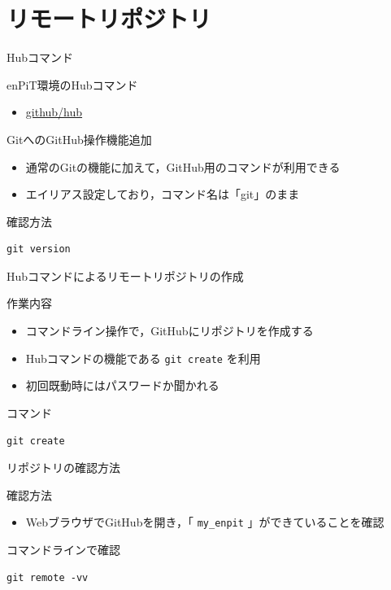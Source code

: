 \documentclass[t, aspectratio=169]{beamer}
\begin{document}
\section{リモートリポジトリ}
\label{sec-2-2}
\begin{frame}[fragile,label=sec-2-2-1]{Hubコマンド}
 \begin{block}{enPiT環境のHubコマンド}
\begin{itemize}
\item \href{https://github.com/github/hub}{github/hub}
\end{itemize}
\end{block}
\begin{block}{GitへのGitHub操作機能追加}
\begin{itemize}
\item 通常のGitの機能に加えて，GitHub用のコマンドが利用できる
\item エイリアス設定しており，コマンド名は「git」のまま
\end{itemize}
\end{block}
\begin{block}{確認方法}
\begin{verbatim}
git version
\end{verbatim}
\end{block}
\end{frame}

\begin{frame}[fragile,label=sec-2-2-2]{Hubコマンドによるリモートリポジトリの作成}
 \begin{block}{作業内容}
\begin{itemize}
\item コマンドライン操作で，GitHubにリポジトリを作成する
\item Hubコマンドの機能である \texttt{git create} を利用
\item 初回既動時にはパスワードか聞かれる
\end{itemize}
\end{block}
\begin{block}{コマンド}
\begin{verbatim}
git create
\end{verbatim}
\end{block}
\end{frame}

\begin{frame}[fragile,label=sec-2-2-3]{リポジトリの確認方法}
 \begin{block}{確認方法}
\begin{itemize}
\item WebブラウザでGitHubを開き，「 \texttt{my\_enpit} 」ができていることを確認
\end{itemize}
\end{block}
\begin{block}{コマンドラインで確認}
\begin{verbatim}
git remote -vv
\end{verbatim}
\end{block}
\end{frame}
\end{document}
